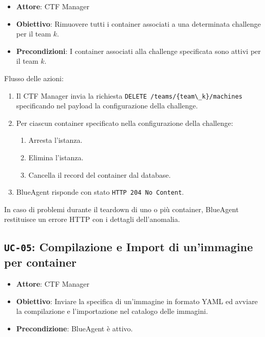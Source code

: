 \begin{itemize}
\tightlist
\item
  \textbf{Attore}: CTF Manager
\item
  \textbf{Obiettivo}: Rimuovere tutti i container associati a una
  determinata challenge per il team \(k\).
\item
  \textbf{Precondizioni}: I container associati alla challenge
  specificata sono attivi per il team \(k\).
\end{itemize}

Flusso delle azioni:

\begin{enumerate}
\def\labelenumi{\arabic{enumi}.}
\tightlist
\item
  Il CTF Manager invia la richiesta
  \passthrough{\lstinline!DELETE /teams/\{team\_k\}/machines!}
  specificando nel payload la configurazione della challenge.
\item
  Per ciascun container specificato nella configurazione della
  challenge:

  \begin{enumerate}
  \def\labelenumii{\arabic{enumii}.}
  \tightlist
  \item
    Arresta l'istanza.
  \item
    Elimina l'istanza.
  \item
    Cancella il record del container dal database.
  \end{enumerate}
\item
  BlueAgent risponde con stato
  \passthrough{\lstinline!HTTP 204 No Content!}.
\end{enumerate}

In caso di problemi durante il teardown di uno o più container,
BlueAgent restituisce un errore HTTP con i dettagli dell'anomalia.

\subsection{\texorpdfstring{\texttt{UC-05}: Compilazione e Import di
un'immagine per
container}{UC-05: Compilazione e Import di un'immagine per container}}\label{uc-05-compilazione-e-import-di-unimmagine-per-container}

\begin{itemize}
\tightlist
\item
  \textbf{Attore}: CTF Manager
\item
  \textbf{Obiettivo}: Inviare la specifica di un'immagine in formato
  YAML ed avviare la compilazione e l'importazione nel catalogo delle
  immagini.
\item
  \textbf{Precondizione}: BlueAgent è attivo.
\end{itemize}

